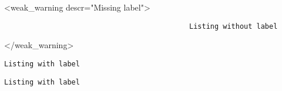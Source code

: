 \documentclass{article}
\begin{document}
    <weak_warning descr="Missing label">\begin{lstlisting}
                                            Listing without label
    \end{lstlisting}</weak_warning>

    \begin{lstlisting}[label={lst:listing-label}, caption={Some caption}]
        Listing with label
    \end{lstlisting}

    \begin{lstlisting}[label=labelwithoutgroup]
        Listing with label
    \end{lstlisting}
\end{document}
